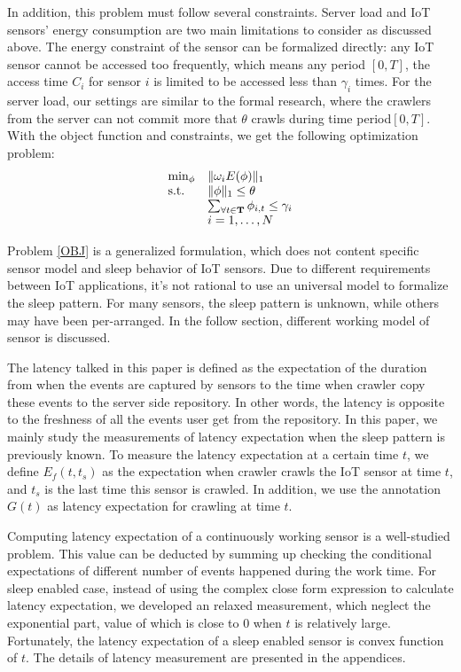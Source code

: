 \documentclass[conference]{IEEEtran}
\begin{document}
In addition, this problem must follow several constraints. Server load and IoT sensors' energy consumption are two main limitations to consider as discussed above. 
The energy constraint of the sensor can be formalized directly: any IoT sensor cannot be accessed too frequently, which means any period $[0, T]$, the access time $C_i$ for sensor $i$ is limited to be accessed less than $\gamma_i$ times. For the server load, our settings are similar to the formal research\cite{Wolf2002}, where the crawlers from the server can not commit more that $\theta$ crawls during time period$[0, T]$.
With the object function and constraints, we get the following optimization problem:
\begin{eqnarray}
\begin{array}{ll}
\min_{\phi}&\Arrowvert \omega_i E(\phi) \Arrowvert_{1}\\
\text{s.t.}
&\Arrowvert \phi \Arrowvert_{1}\leq\theta\\
&\sum_{\forall t \in \mathbf{T}}{\phi_{i,t}}\leq\gamma_i\\
&i=1,\ldots,N
\end{array}\label{OBJ}
\end{eqnarray}

Problem \eqref{OBJ} is a generalized formulation, which does not content specific sensor model and sleep behavior of IoT sensors. Due to different requirements between IoT applications, it's not rational to use an universal model to formalize the sleep pattern. For many sensors, the sleep pattern is unknown, while others may have been per-arranged.  In the follow section, different working model of sensor is discussed. 

The latency talked in this paper is defined as the expectation of the duration from when the events are captured by sensors to the time when crawler copy these events to the server side repository. In other words, the latency is opposite to the freshness of all the events user get from the repository.
In this paper, we mainly study the measurements of latency expectation when the sleep pattern is previously known.
To measure the latency expectation at a certain time $t$, we define $E_f(t, t_s)$ as the expectation when crawler crawls the IoT sensor at time $t$, and $t_s$ is the last time this sensor is crawled. In addition, we use the annotation $G(t)$ as latency expectation for crawling at time $t$.

Computing latency expectation of a continuously working sensor is a well-studied problem\cite{Cho2000, Wolf2002}. 
This value can be deducted by summing up checking the conditional expectations of different number of events happened during the work time. 
For sleep enabled case, instead of using the complex close form expression to calculate latency expectation, we developed an relaxed measurement, which neglect the exponential part, value of which is close to $0$ when $t$ is relatively large. Fortunately, the latency expectation of a sleep enabled sensor is convex function of $t$.
The details of latency measurement are presented in the appendices. 
\end{document}
